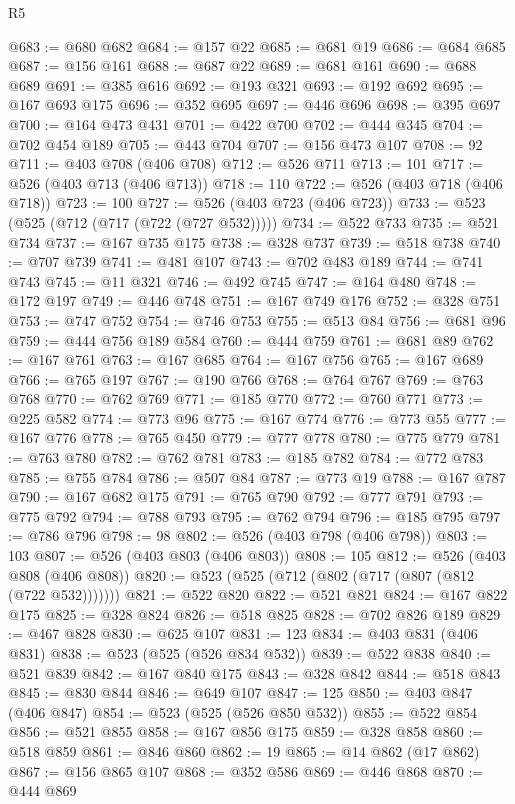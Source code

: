 \begin{lexlean}{R5}
\begin{coremodule}
{{{{{{{{{{{{{{{{{{{{{{{{{{{{{{{{{{{{{{{{{{{{{{{{{{{{{{{{{{{{{{@683 := @680 @682
@684 := @157 @22
@685 := @681 @19
@686 := @684 @685
@687 := @156 @161
@688 := @687 @22
@689 := @681 @161
@690 := @688 @689
@691 := @385 @616
@692 := @193 @321
@693 := @192 @692
@695 := @167 @693 @175
@696 := @352 @695
@697 := @446 @696
@698 := @395 @697
@700 := @164 @473 @431
@701 := @422 @700
@702 := @444 @345
@704 := @702 @454 @189
@705 := @443 @704
@707 := @156 @473 @107
@708 := 92
@711 := @403 @708 (@406 @708)
@712 := @526 @711
@713 := 101
@717 := @526 (@403 @713 (@406 @713))
@718 := 110
@722 := @526 (@403 @718 (@406 @718))
@723 := 100
@727 := @526 (@403 @723 (@406 @723))
@733 := @523 (@525 (@712 (@717 (@722 (@727 @532)))))
@734 := @522 @733
@735 := @521 @734
@737 := @167 @735 @175
@738 := @328 @737
@739 := @518 @738
@740 := @707 @739
@741 := @481 @107
@743 := @702 @483 @189
@744 := @741 @743
@745 := @11 @321
@746 := @492 @745
@747 := @164 @480
@748 := @172 @197
@749 := @446 @748
@751 := @167 @749 @176
@752 := @328 @751
@753 := @747 @752
@754 := @746 @753
@755 := @513 @84
@756 := @681 @96
@759 := @444 @756 @189 @584
@760 := @444 @759
@761 := @681 @89
@762 := @167 @761
@763 := @167 @685
@764 := @167 @756
@765 := @167 @689
@766 := @765 @197
@767 := @190 @766
@768 := @764 @767
@769 := @763 @768
@770 := @762 @769
@771 := @185 @770
@772 := @760 @771
@773 := @225 @582
@774 := @773 @96
@775 := @167 @774
@776 := @773 @55
@777 := @167 @776
@778 := @765 @450
@779 := @777 @778
@780 := @775 @779
@781 := @763 @780
@782 := @762 @781
@783 := @185 @782
@784 := @772 @783
@785 := @755 @784
@786 := @507 @84
@787 := @773 @19
@788 := @167 @787
@790 := @167 @682 @175
@791 := @765 @790
@792 := @777 @791
@793 := @775 @792
@794 := @788 @793
@795 := @762 @794
@796 := @185 @795
@797 := @786 @796
@798 := 98
@802 := @526 (@403 @798 (@406 @798))
@803 := 103
@807 := @526 (@403 @803 (@406 @803))
@808 := 105
@812 := @526 (@403 @808 (@406 @808))
@820 := @523 (@525 (@712 (@802 (@717 (@807 (@812 (@722 @532)))))))
@821 := @522 @820
@822 := @521 @821
@824 := @167 @822 @175
@825 := @328 @824
@826 := @518 @825
@828 := @702 @826 @189
@829 := @467 @828
@830 := @625 @107
@831 := 123
@834 := @403 @831 (@406 @831)
@838 := @523 (@525 (@526 @834 @532))
@839 := @522 @838
@840 := @521 @839
@842 := @167 @840 @175
@843 := @328 @842
@844 := @518 @843
@845 := @830 @844
@846 := @649 @107
@847 := 125
@850 := @403 @847 (@406 @847)
@854 := @523 (@525 (@526 @850 @532))
@855 := @522 @854
@856 := @521 @855
@858 := @167 @856 @175
@859 := @328 @858
@860 := @518 @859
@861 := @846 @860
@862 := 19
@865 := @14 @862 (@17 @862)
@867 := @156 @865 @107
@868 := @352 @586
@869 := @446 @868
@870 := @444 @869
}}}}}}}}}}}}}}}}}}}}}}}}}}}}}}}}}}}}}}}}}}}}}}}}}}}}}}}}}}}}}}
\end{coremodule}
\end{lexlean}
